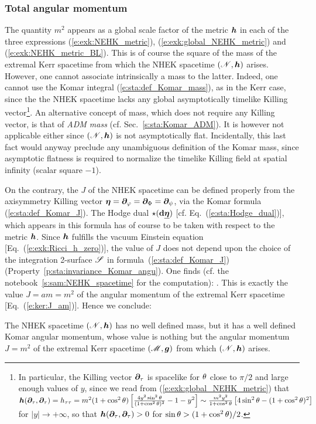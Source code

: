 \subsubsection{Total angular momentum}

The quantity $m^2$ appears as a global scale factor of the metric $\bm{h}$ in
each of the three expressions (\ref{e:exk:NEHK_metric}), (\ref{e:exk:global_NEHK_metric})
and (\ref{e:exk:NEHK_metric_BL}). This is of course the square of the mass of the extremal
Kerr spacetime from which the NHEK spacetime $(\mathscr{N},\bm{h})$ arises. However, one cannot
associate intrinsically a mass to the latter. Indeed, one cannot use the
Komar integral
(\ref{e:sta:def_Komar_mass}), as in the Kerr case, since the
the NHEK spacetime lacks any
global asymptotically timelike Killing vector\footnote{In particular, the Killing vector
$\bm{\partial}_\tau$ is spacelike for $\theta$ close to $\pi/2$ and large enough values of $y$, since
we read from (\ref{e:exk:global_NEHK_metric}) that
$\bm{h}(\bm{\partial}_\tau, \bm{\partial}_\tau) = h_{\tau\tau} = m^2 (1 + \cos^2\theta)
\left[ \frac{4 y^2 \sin^2\theta}{(1 + \cos^2\theta)^2} - 1 - y^2 \right]
\sim \frac{m^2 y^2}{1 + \cos^2\theta} \left[ 4 \sin^2\theta - (1 + \cos^2\theta)^2 \right]$
for $|y|\to +\infty$, so that $\bm{h}(\bm{\partial}_\tau, \bm{\partial}_\tau) > 0$ for
$\sin\theta > (1 + \cos^2\theta)/2$.}.
An alternative concept of mass, which does not require any Killing vector,
is that of \emph{ADM mass} (cf. Sec.~\ref{s:sta:Komar_ADM}).
It is however not applicable either since
$(\mathscr{N},\bm{h})$ is not asymptotically flat. Incidentally, this last fact would
anyway preclude any unambiguous definition of the Komar mass, since asymptotic flatness
is required to normalize the timelike Killing field  at spatial
infinity (scalar square $-1$).

On the contrary, the
 $J$
of the NHEK spacetime can be defined
properly from the axisymmetry Killing vector
$\bm{\eta} = \bm{\partial}_{\varphi} = \bm{\partial}_{\Phi} = \bm{\partial}_{\psi}$, via
the Komar formula (\ref{e:sta:def_Komar_J}). The Hodge dual $\star(\mathbf{d} \underline{\bm{\eta}})$
[cf. Eq.~(\ref{e:sta:Hodge_dual})], which appears in this formula has of course to be taken with respect to the metric $\bm{h}$.
Since $\bm{h}$ fulfills the vacuum Einstein equation [Eq.~(\ref{e:exk:Ricci_h_zero})], the value
of $J$ does not depend upon the choice of the integration 2-surface $\mathscr{S}$
in formula~(\ref{e:sta:def_Komar_J})
(Property~\ref{p:sta:invariance_Komar_angu}). One
finds (cf. the notebook~\ref{s:sam:NEHK_spacetime} for the computation):
\be
     .
\ee
This is exactly the value $J = a m = m^2$ of the angular momentum of the
extremal Kerr spacetime [Eq.~(\ref{e:ker:J_am})]. Hence we conclude:
\begin{prop}
The NHEK spacetime $(\mathscr{N},\bm{h})$ has no well defined mass, but it has a well defined
Komar angular momentum, whose value is nothing but the angular momentum $J = m^2$
of the extremal Kerr spacetime $(\mathscr{M},\bm{g})$ from which $(\mathscr{N},\bm{h})$ arises.
\end{prop}

